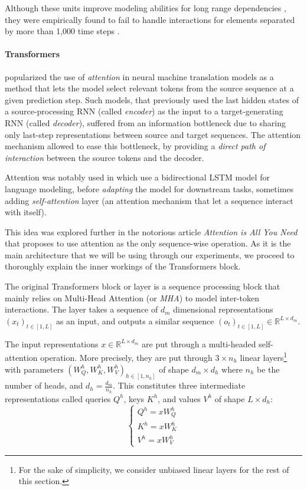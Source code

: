 Although these units improve modeling abilities for long range dependencies \citep{rnn_eval}, they were empirically found to fail to handle interactions for elements separated by more than 1,000 time steps \citep{HochSchm97}.

\paragraph*{Transformers}

\citet{bahdanau_nmt} popularized the use of \textit{attention} in neural machine translation models as a method that lets the model select relevant tokens from the source sequence at a given prediction step. Such models, that previously used the last hidden states of a source-processing RNN (called \textit{encoder}) as the input to a target-generating RNN (called \textit{decoder}), suffered from an information bottleneck due to sharing only last-step representations between source and target sequences. The attention mechanism allowed to ease this bottleneck, by providing a \textit{direct path of interaction} between the source tokens and the decoder.

Attention was notably used in \citet{peters-etal-2018-deep} which use a bidirectional LSTM model for language modeling, before \textit{adapting} the model for downstream tasks, sometimes adding \textit{self-attention} layer (an attention mechanism that let a sequence interact with itself).

This idea was explored further in the notorious article \textit{Attention is All You Need} \citep{vaswani2017attention} that proposes to use attention as the only sequence-wise operation. As it is the main architecture that we will be using through our experiments, we proceed to thoroughly explain the inner workings of the Transformers block.

The original Transformers block or layer is a sequence processing block that mainly relies on Multi-Head Attention (or \textit{MHA}) to model inter-token interactions. The layer takes a sequence of $d_m$ dimensional representations $(x_t)_{t \in [1, L]}$ as an input, and outputs a similar sequence $(o_t)_{t \in [1, L]} \in \mathbb{R}^{L \times d_m}$. 

The input representations $x \in \mathbb{R}^{L \times d_m}$ are put through a multi-headed self-attention operation. More precisely, they are put through $3 \times n_h$ linear layers\footnote{For the sake of simplicity, we consider unbiased linear layers for the rest of this section.} with parameters $(W_Q^h, W_K^h, W_V^h)_{h \in [1, n_h]}$ of shape $d_m \times d_h$ where $n_h$ be the number of heads, and $d_h = \frac{d_m}{n_h}$. This constitutes three intermediate representations called queries $Q^h$, keys $K^h$, and values $V^h$ of shape $L \times d_h$:
\begin{equation*}
    \begin{cases}
        Q^h = x W_Q^h \\
        K^h = x W_K^h \\
        V^h = x W_V^h
    \end{cases}
\end{equation*}

